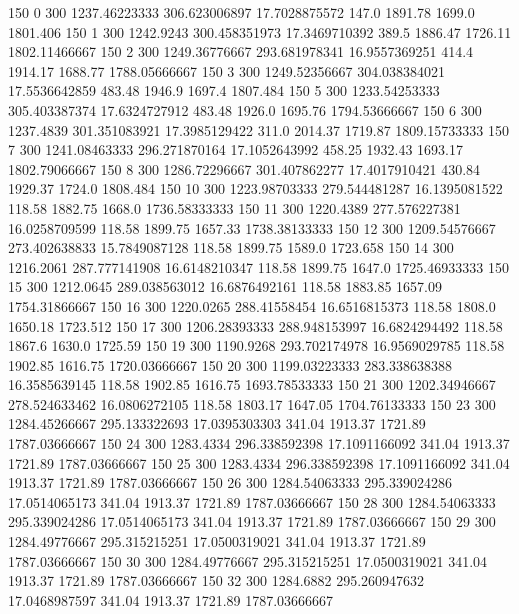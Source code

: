 150  0  300  1237.46223333  306.623006897  17.7028875572  147.0  1891.78  1699.0  1801.406 
150  1  300  1242.9243  300.458351973  17.3469710392  389.5  1886.47  1726.11  1802.11466667 
150  2  300  1249.36776667  293.681978341  16.9557369251  414.4  1914.17  1688.77  1788.05666667 
150  3  300  1249.52356667  304.038384021  17.5536642859  483.48  1946.9  1697.4  1807.484 
150  5  300  1233.54253333  305.403387374  17.6324727912  483.48  1926.0  1695.76  1794.53666667 
150  6  300  1237.4839  301.351083921  17.3985129422  311.0  2014.37  1719.87  1809.15733333 
150  7  300  1241.08463333  296.271870164  17.1052643992  458.25  1932.43  1693.17  1802.79066667 
150  8  300  1286.72296667  301.407862277  17.4017910421  430.84  1929.37  1724.0  1808.484 
150  10  300  1223.98703333  279.544481287  16.1395081522  118.58  1882.75  1668.0  1736.58333333 
150  11  300  1220.4389  277.576227381  16.0258709599  118.58  1899.75  1657.33  1738.38133333 
150  12  300  1209.54576667  273.402638833  15.7849087128  118.58  1899.75  1589.0  1723.658 
150  14  300  1216.2061  287.777141908  16.6148210347  118.58  1899.75  1647.0  1725.46933333 
150  15  300  1212.0645  289.038563012  16.6876492161  118.58  1883.85  1657.09  1754.31866667 
150  16  300  1220.0265  288.41558454  16.6516815373  118.58  1808.0  1650.18  1723.512 
150  17  300  1206.28393333  288.948153997  16.6824294492  118.58  1867.6  1630.0  1725.59 
150  19  300  1190.9268  293.702174978  16.9569029785  118.58  1902.85  1616.75  1720.03666667 
150  20  300  1199.03223333  283.338638388  16.3585639145  118.58  1902.85  1616.75  1693.78533333 
150  21  300  1202.34946667  278.524633462  16.0806272105  118.58  1803.17  1647.05  1704.76133333 
150  23  300  1284.45266667  295.133322693  17.0395303303  341.04  1913.37  1721.89  1787.03666667 
150  24  300  1283.4334  296.338592398  17.1091166092  341.04  1913.37  1721.89  1787.03666667 
150  25  300  1283.4334  296.338592398  17.1091166092  341.04  1913.37  1721.89  1787.03666667 
150  26  300  1284.54063333  295.339024286  17.0514065173  341.04  1913.37  1721.89  1787.03666667 
150  28  300  1284.54063333  295.339024286  17.0514065173  341.04  1913.37  1721.89  1787.03666667 
150  29  300  1284.49776667  295.315215251  17.0500319021  341.04  1913.37  1721.89  1787.03666667 
150  30  300  1284.49776667  295.315215251  17.0500319021  341.04  1913.37  1721.89  1787.03666667 
150  32  300  1284.6882  295.260947632  17.0468987597  341.04  1913.37  1721.89  1787.03666667 

